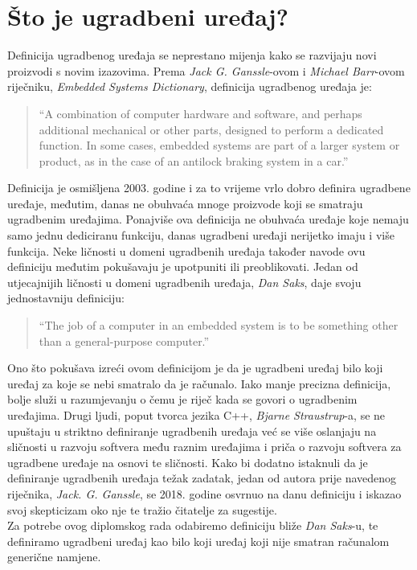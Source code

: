 \section{Što je ugradbeni uređaj?}
Definicija ugradbenog uređaja se neprestano mijenja kako se razvijaju novi proizvodi s novim izazovima. Prema \textit{Jack G. Ganssle}-ovom i \textit{Michael Barr}-ovom riječniku, \textit{Embedded Systems Dictionary}\cite{ganssle2003embedded}, definicija ugradbenog uređaja je:
\begin{quote}
    ``A combination of computer hardware and software, and perhaps additional mechanical or other parts, designed to perform a dedicated function. In some cases, embedded systems are part of a larger system or product, as in the case of an antilock braking system in a car.''
\end{quote}
Definicija je osmišljena 2003. godine i za to vrijeme vrlo dobro definira ugradbene uređaje, međutim, danas ne obuhvaća mnoge proizvode koji se smatraju ugradbenim uređajima. Ponajviše ova definicija ne obuhvaća uređaje koje nemaju samo jednu dediciranu funkciju, danas ugradbeni uređaji nerijetko imaju i više funkcija. Neke ličnosti u domeni ugradbenih uređaja također navode ovu definiciju međutim pokušavaju je upotpuniti ili preoblikovati. Jedan od utjecajnijih ličnosti u domeni ugradbenih uređaja, \textit{Dan Saks}, daje svoju jednostavniju definiciju\cite{danSaksWritingBetterEmbeddedSoftware}:
\begin{quote}
    ``The job of a computer in an embedded system is to be something other than a general-purpose computer.''
\end{quote}
Ono što pokušava izreći ovom definicijom je da je ugradbeni uređaj bilo koji uređaj za koje se nebi smatralo da je računalo. Iako manje precizna definicija, bolje služi u razumjevanju o čemu je riječ kada se govori o ugradbenim uređajima. Drugi ljudi, poput tvorca jezika C++, \textit{Bjarne Straustrup}-a, se ne upuštaju u striktno definiranje\cite{bjarneC++ForEmbeddedSystems} ugradbenih uređaja već se više oslanjaju na sličnosti u razvoju softvera među raznim uređajima i priča o razvoju softvera za ugradbene uređaje na osnovi te sličnosti. Kako bi dodatno istaknuli da je definiranje ugradbenih uređaja težak zadatak, jedan od autora prije navedenog riječnika, \textit{Jack. G. Ganssle}, se 2018.\cite{embeddedDotComWhatsEmbedded} godine osvrnuo na danu definiciju i iskazao svoj skepticizam oko nje te tražio čitatelje za sugestije. \\
Za potrebe ovog diplomskog rada odabiremo definiciju bliže \textit{Dan Saks}-u, te definiramo ugradbeni uređaj kao bilo koji uređaj koji nije smatran računalom generične namjene.     
\pagebreak

